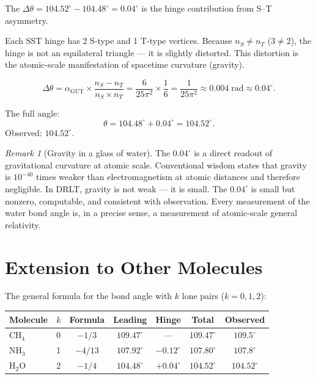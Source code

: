 \documentclass[12pt]{article}
\theoremstyle{remark}
\newtheorem{remark}[theorem]{Remark}
\begin{document}
The $\Delta\theta = 104.52^\circ - 104.48^\circ = 0.04^\circ$ is the hinge contribution from S--T asymmetry.

Each SST hinge has 2 S-type and 1 T-type vertices. Because $n_S \neq n_T$ ($3 \neq 2$), the hinge is not an equilateral triangle --- it is slightly distorted. This distortion is the atomic-scale manifestation of spacetime curvature (gravity).

\begin{equation}
\Delta\theta = \alpha_\text{GUT} \times \frac{n_S - n_T}{n_S \times n_T} = \frac{6}{25\pi^2} \times \frac{1}{6} = \frac{1}{25\pi^2} \approx 0.004\;\text{rad} \approx 0.04^\circ.
\end{equation}

The full angle:
\begin{equation}
\theta = 104.48^\circ + 0.04^\circ = 104.52^\circ.
\end{equation}
Observed: $104.52^\circ$.

\begin{remark}[Gravity in a glass of water]
The $0.04^\circ$ is a direct readout of gravitational curvature at atomic scale. Conventional wisdom states that gravity is $10^{-40}$ times weaker than electromagnetism at atomic distances and therefore negligible. In DRLT, gravity is not weak --- it is small. The $0.04^\circ$ is small but nonzero, computable, and consistent with observation. Every measurement of the water bond angle is, in a precise sense, a measurement of atomic-scale general relativity.
\end{remark}

\section{Extension to Other Molecules}

The general formula for the bond angle with $k$ lone pairs ($k = 0, 1, 2$):

\begin{center}
\begin{tabular}{lcccccc}
\hline
Molecule & $k$ & Formula & Leading & Hinge & Total & Observed \\
\hline
CH$_4$ & 0 & $-1/3$ & $109.47^\circ$ & --- & $109.47^\circ$ & $109.5^\circ$ \\
NH$_3$ & 1 & $-4/13$ & $107.92^\circ$ & $-0.12^\circ$ & $107.80^\circ$ & $107.8^\circ$ \\
H$_2$O & 2 & $-1/4$ & $104.48^\circ$ & $+0.04^\circ$ & $104.52^\circ$ & $104.52^\circ$ \\
\hline
\end{tabular}
\end{center}
\end{document}
